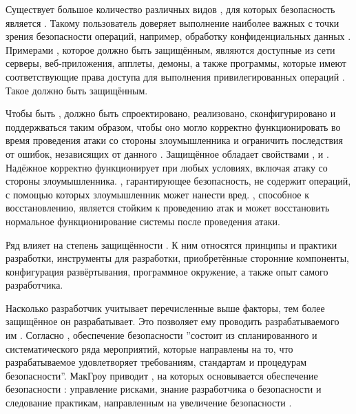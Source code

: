 %
Существует большое количество различных видов , для которых безопасность является . 
%
Такому  пользователь доверяет выполнение наиболее важных с точки зрения безопасности операций, например, обработку конфиденциальных данных . 
%
Примерами , которое должно быть защищённым, являются доступные из сети серверы, веб-приложения, апплеты, демоны, а также программы, которые имеют соответствующие права доступа для выполнения привилегированных операций . 
%
Такое  должно быть защищённым.

%
Чтобы быть ,  должно быть спроектировано, реализовано, сконфигурировано и поддержваться таким образом, чтобы оно могло корректно функционировать во время проведения атаки со стороны злоумышленника и ограничить последствия от ошибок, независящих от данного  . 
%
Защищённое  обладает свойствами ,  и  . 
%
Надёжное  корректно функционирует при любых условиях, включая атаку со стороны злоумышленника. 
%
, гарантирующее безопасность, не содержит операций, с помощью которых злоумышленник может нанести вред. 
%
, способное к восстановлению, является стойким к проведению атак и может восстановить нормальное функционирование системы после проведения атаки.

%
Ряд  влияет на степень защищённости  . 
%
К ним относятся принципы и практики разработки, инструменты для разработки, приобретённые сторонние компоненты, конфигурация развёртывания, программное окружение, а также опыт самого разработчика.

%
Насколько разработчик учитывает перечисленные выше факторы, тем более защищённое  он разрабатывает. 
%
Это позволяет ему проводить  разрабатываемого им . 
%
Согласно , обеспечение безопасности  ''состоит из спланированного и систематического ряда мероприятий, которые направлены на то, что разрабатываемое  удовлетворяет требованиям, стандартам и процедурам безопасности''.
%
МакГроу приводит , на которых основывается обеспечение безопасности : управление рисками, знание разработчика о безопасности и следование практикам, направленным на увеличение безопасности .

